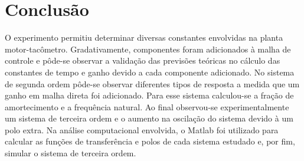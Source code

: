 \section{Conclusão}
O experimento permitiu determinar diversas constantes envolvidas na planta motor-tacômetro. Gradativamente, componentes foram adicionados à malha de controle e pôde-se observar a validação das previsões teóricas no cálculo das constantes de tempo e ganho devido a cada componente adicionado. No sistema de segunda ordem pôde-se observar diferentes tipos de resposta a medida que um ganho em malha direta foi adicionado. Para esse sistema calculou-se a fração de amortecimento e a frequência natural. Ao final observou-se experimentalmente um sistema de terceira ordem e o aumento na oscilação do sistema devido à um polo extra. Na análise computacional envolvida, o Matlab foi utilizado para calcular as funções de transferência e polos de cada sistema estudado e, por fim, simular o sistema de terceira ordem.